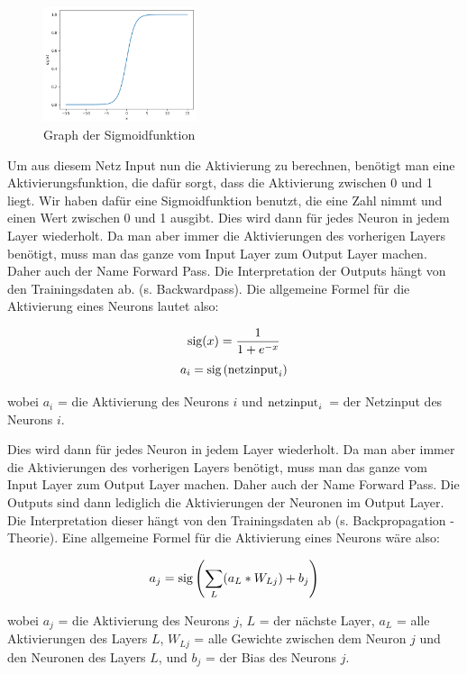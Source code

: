 \documentclass{scrartcl}
\begin{document}
	\newpage

	\begin{figure}
		\centering
		\includegraphics[width=0.4\textwidth]{pictures/sig_func.png}
		\caption{Graph der Sigmoidfunktion}
		\label{sig_func}
	\end{figure}

	Um aus diesem Netz Input nun die Aktivierung zu berechnen, benötigt man eine Aktivierungsfunktion, die dafür sorgt, dass die Aktivierung zwischen 0 und 1 liegt. Wir haben dafür eine Sigmoidfunktion benutzt, die eine Zahl nimmt und einen Wert zwischen 0 und 1 ausgibt. Dies wird dann für jedes Neuron in jedem Layer wiederholt. Da man aber immer die Aktivierungen des vorherigen Layers benötigt, muss man das ganze vom Input Layer zum Output Layer machen. Daher auch der Name Forward Pass. Die Interpretation der Outputs hängt von den Trainingsdaten ab. (s. Backwardpass). Die allgemeine Formel für die Aktivierung eines Neurons lautet also:


	{\Large
	\[
		\textrm{sig}(x)=\frac{1}{1+e^{-x}}
		\]
	\[
		a_i=\textrm{sig}\left({\textrm{netzinput}}_i \right)
		\]}
	
	wobei $a_i$ = die Aktivierung des Neurons $i$ und $\textrm{netzinput}_{i}$ = der Netzinput des Neurons $i$.

	Dies wird dann für jedes Neuron in jedem Layer wiederholt. Da man aber immer die Aktivierungen des vorherigen Layers benötigt, muss man das ganze vom Input Layer zum Output Layer machen. Daher auch der Name Forward Pass. Die Outputs sind dann lediglich die Aktivierungen der Neuronen im Output Layer. Die Interpretation dieser hängt von den Trainingsdaten ab (s. Backpropagation - Theorie). Eine allgemeine Formel für die Aktivierung eines Neurons wäre also: 

	{\Large \[
		a_{j} = \textrm{sig}\left(\sum_{L} (a_{L} * W_{Lj}) + b_{j}\right)
		\]}
		
	\noindent wobei $a_j$ = die Aktivierung des Neurons $j$, $L$ = der nächste Layer, $a_L$ = alle Aktivierungen des Layers $L$, $W_{Lj}$ = alle Gewichte zwischen dem Neuron $j$ und den Neuronen des Layers $L$, und $b_j$ = der Bias des Neurons $j$. \cite{brotcrunsher:forwardpass}
	
\end{document}
